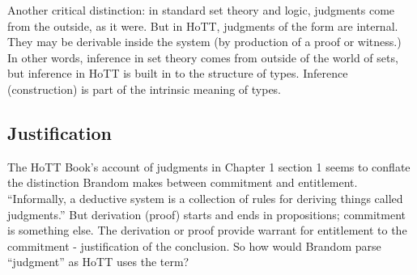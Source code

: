 Another critical distinction: in standard set theory and logic,
judgments come from the outside, as it were.  But in HoTT, judgments
of the form \atypeA are internal.  They may be derivable inside the
system (by production of a proof or witness.)  In other words,
inference in set theory comes from outside of the world of sets, but
inference in HoTT is built in to the structure of types.  Inference
(construction) is part of the intrinsic meaning of types.

\subsection{Justification}
\label{subs:just}

The HoTT Book's account of judgments in Chapter 1 section 1 seems to
conflate the distinction Brandom makes between commitment and
entitlement.  ``Informally, a deductive system is a collection of
rules for deriving things called judgments.''  But derivation (proof)
starts and ends in propositions; commitment is something else.  The
derivation or proof provide warrant for entitlement to the commitment
- justification of the conclusion.  So how would Brandom parse
``judgment'' as HoTT uses the term?


